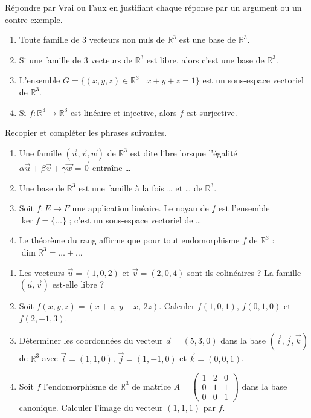 \documentclass[11pt]{article}
\newcommand{\cle}[1]{{\popxbold\color{popdark}#1}}
\begin{document}
\begin{exercice}
Répondre par Vrai ou Faux en justifiant chaque réponse par un argument ou un contre-exemple.
\begin{enumerate}
\item Toute famille de $3$ vecteurs non nuls de $\mathbb{R}^3$ est une base de $\mathbb{R}^3$.
\item Si une famille de $3$ vecteurs de $\mathbb{R}^3$ est libre, alors c'est une base de $\mathbb{R}^3$.
\item L'ensemble $G = \{(x, y, z) \in \mathbb{R}^3 \mid x + y + z = 1\}$ est un sous-espace vectoriel de $\mathbb{R}^3$.
\item Si $f : \mathbb{R}^3 \to \mathbb{R}^3$ est linéaire et injective, alors $f$ est surjective.
\end{enumerate}
\end{exercice}

\begin{exercice}
Recopier et compléter les phrases suivantes.
\begin{enumerate}
\item Une famille $(\vec{u}, \vec{v}, \vec{w})$ de $\mathbb{R}^3$ est dite \cle{libre} lorsque l'égalité $\alpha \vec{u} + \beta \vec{v} + \gamma \vec{w} = \vec{0}$ entraîne \ldots
\item Une \cle{base} de $\mathbb{R}^3$ est une famille à la fois \ldots{} et \ldots{} de $\mathbb{R}^3$.
\item Soit $f : E \to F$ une application linéaire. Le \cle{noyau} de $f$ est l'ensemble $\ker f = \{\ldots\}$ ; c'est un sous-espace vectoriel de \ldots
\item Le théorème du rang affirme que pour tout endomorphisme $f$ de $\mathbb{R}^3$ : $\dim \mathbb{R}^3 = \ldots + \ldots$
\end{enumerate}
\end{exercice}

\begin{exercice}
\begin{enumerate}
\item Les vecteurs $\vec{u} = (1, 0, 2)$ et $\vec{v} = (2, 0, 4)$ sont-ils colinéaires ? La famille $(\vec{u}, \vec{v})$ est-elle libre ?
\item Soit $f(x, y, z) = (x + z, \, y - x, \, 2z)$. Calculer $f(1, 0, 1)$, $f(0, 1, 0)$ et $f(2, -1, 3)$.
\item Déterminer les coordonnées du vecteur $\vec{a} = (5, 3, 0)$ dans la base $(\vec{i}, \vec{j}, \vec{k})$ de $\mathbb{R}^3$ avec $\vec{i} = (1, 1, 0)$, $\vec{j} = (1, -1, 0)$ et $\vec{k} = (0, 0, 1)$.
\item Soit $f$ l'endomorphisme de $\mathbb{R}^3$ de matrice $A = \begin{pmatrix} 1 & 2 & 0 \\ 0 & 1 & 1 \\ 0 & 0 & 1 \end{pmatrix}$ dans la base canonique. Calculer l'image du vecteur $(1, 1, 1)$ par $f$.
\end{enumerate}
\end{exercice}
\end{document}
